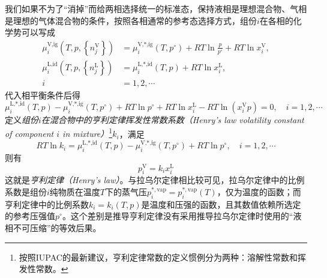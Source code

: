 \documentclass[main.tex]{subfiles}
\begin{document}
我们如果不为了“消掉”而给两相选择统一的标准态，保持液相是理想混合物、气相是理想的气体混合物的条件，按照各相通常的参考态选择方式，组份$i$在各相的化学势可以写成
\begin{align*}
  \mu_i^\text{V,ig}\left(T,p,\left\{n_j^\text{V}\right\}\right) & =\mu_i^\text{V,*,ig}\left(T,p^\circ\right)+RT\ln\frac{p}{p^\circ}+RT\ln x_i^\text{V}, \\
  \mu_i^\text{L,id}\left(T,p,\left\{n_j^\text{L}\right\}\right) & =\mu_i^\text{L,*,id}\left(T,p\right)+RT\ln x_i^\text{L},                              \\
  i                                                             & =1,2,\cdots
\end{align*}
代入相平衡条件后得
\[
  \mu_i^\text{L,*,id}\left(T,p\right)-\mu_i^\text{V,*,ig}\left(T,p^\circ\right)+RT\ln p^\circ+RT\ln x_i^\text{L}-RT\ln\left(x_i^\text{V}p\right)=0,\quad i=1,2,\cdots
\]
定义\emph{组份$i$在混合物中的亨利定律挥发性常数系数（Henry's law volatility constant of component $i$ in mixture）}\footnote{按照IUPAC的最新建议\cite{Sander2022}，亨利定律常数的定义惯例分为两种：溶解性常数和挥发性常数。}$k_i$，满足
\[RT\ln k_i=\mu_i^\text{L,*,id}\left(T,p\right)-\mu_i^\text{V,*,ig}\left(T,p^\circ\right)+RT\ln p^\circ,\quad i=1,2,\cdots\]
则有
\[p_i^\text{V}=k_ix_i^\text{L}\]
这就是\emph{亨利定律（Henry's law）}。与拉乌尔定律相比较可见，拉乌尔定律中的比例系数是组份$i$纯物质在温度$T$下的蒸气压$p_i^{*,\text{vap}}=p_i^{*,\text{vap}}\left(T\right)$，仅为温度的函数；而亨利定律中的比例系数$k_i=k_i\left(T,p\right)$是温度和压强的函数，且其数值依赖所选定的参考压强值$p^\circ$。这个差别是推导亨利定律没有采用推导拉乌尔定律时使用的“液相不可压缩”的等效后果。
\end{document}

